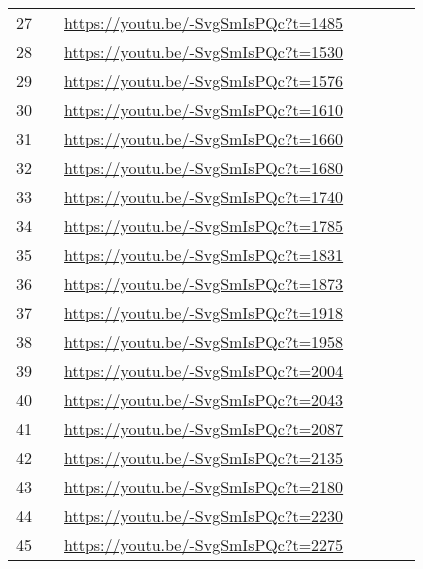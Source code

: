 \begin{longtable*}[]{ccp{2.0cm} p{5.0cm} p{5.0cm} p{5.0cm} p{5.0cm}}
27 &  & \url{https://youtu.be/-SvgSmIsPQc?t=1485} \\
28 &  & \url{https://youtu.be/-SvgSmIsPQc?t=1530} \\
29 &  & \url{https://youtu.be/-SvgSmIsPQc?t=1576} \\
30 &  & \url{https://youtu.be/-SvgSmIsPQc?t=1610} \\
31 &  & \url{https://youtu.be/-SvgSmIsPQc?t=1660} \\
32 &  & \url{https://youtu.be/-SvgSmIsPQc?t=1680} \\
33 &  & \url{https://youtu.be/-SvgSmIsPQc?t=1740} \\
34 &  & \url{https://youtu.be/-SvgSmIsPQc?t=1785} \\
35 &  & \url{https://youtu.be/-SvgSmIsPQc?t=1831} \\
36 &  & \url{https://youtu.be/-SvgSmIsPQc?t=1873} \\
37 &  & \url{https://youtu.be/-SvgSmIsPQc?t=1918} \\
38 &  & \url{https://youtu.be/-SvgSmIsPQc?t=1958} \\
39 &  & \url{https://youtu.be/-SvgSmIsPQc?t=2004} \\
40 &  & \url{https://youtu.be/-SvgSmIsPQc?t=2043} \\
41 &  & \url{https://youtu.be/-SvgSmIsPQc?t=2087} \\
42 &  & \url{https://youtu.be/-SvgSmIsPQc?t=2135} \\
43 &  & \url{https://youtu.be/-SvgSmIsPQc?t=2180} \\
44 &  & \url{https://youtu.be/-SvgSmIsPQc?t=2230} \\
45 &  & \url{https://youtu.be/-SvgSmIsPQc?t=2275} \\

\end{longtable*}
